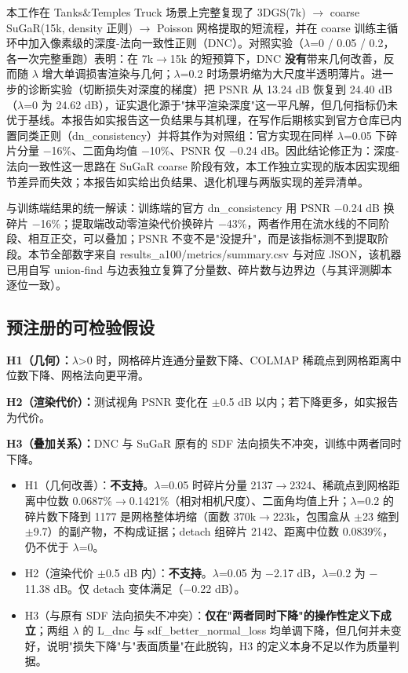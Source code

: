 \documentclass[UTF8,a4paper,11pt]{ctexart}
\begin{document}
本工作在 Tanks\&Temples Truck 场景上完整复现了 3DGS(7k) $\rightarrow$ coarse SuGaR(15k, density 正则) $\rightarrow$ Poisson 网格提取的短流程，并在 coarse 训练主循环中加入像素级的深度-法向一致性正则（DNC）。对照实验（$\lambda$=0 / 0.05 / 0.2，各一次完整重跑）表明：在 7k$\rightarrow$15k 的短预算下，DNC \textbf{没有}带来几何改善，反而随 $\lambda$ 增大单调损害渲染与几何；$\lambda$=0.2 时场景坍缩为大尺度半透明薄片。进一步的诊断实验（切断损失对深度的梯度）把 PSNR 从 13.24 dB 恢复到 24.40 dB（$\lambda$=0 为 24.62 dB），证实退化源于"抹平渲染深度"这一平凡解，但几何指标仍未优于基线。本报告如实报告这一负结果与其机理，在写作后期核实到官方仓库已内置同类正则（dn\_consistency）并将其作为对照组：官方实现在同样 $\lambda$=0.05 下碎片分量 $-$16\%、二面角均值 $-$10\%、PSNR 仅 $-$0.24 dB。因此结论修正为：深度-法向一致性这一思路在 SuGaR coarse 阶段有效，本工作独立实现的版本因实现细节差异而失效；本报告如实给出负结果、退化机理与两版实现的差异清单。

与训练端结果的统一解读：训练端的官方 dn\_consistency 用 PSNR $-$0.24 dB 换碎片 $-$16\%；提取端改动零渲染代价换碎片 $-$43\%，两者作用在流水线的不同阶段、相互正交，可以叠加；PSNR 不变不是"没提升"，而是该指标测不到提取阶段。本节全部数字来自 results\_a100/metrics/summary.csv 与对应 JSON，该机器已用自写 union-find 与边表独立复算了分量数、碎片数与边界边（与其评测脚本逐位一致）。

\subsection{预注册的可检验假设}
\textbf{H1（几何）：}$\lambda$>0 时，网格碎片连通分量数下降、COLMAP 稀疏点到网格距离中位数下降、网格法向更平滑。

\textbf{H2（渲染代价）：}测试视角 PSNR 变化在 $\pm$0.5 dB 以内；若下降更多，如实报告为代价。

\textbf{H3（叠加关系）：}DNC 与 SuGaR 原有的 SDF 法向损失不冲突，训练中两者同时下降。

\begin{itemize}
\setlength{\itemsep}{2pt}
  \item H1（几何改善）：\textbf{不支持}。$\lambda$=0.05 时碎片分量 2137$\rightarrow$2324、稀疏点到网格距离中位数 0.0687\%$\rightarrow$0.1421\%（相对相机尺度）、二面角均值上升；$\lambda$=0.2 的碎片数下降到 1177 是网格整体坍缩（面数 370k$\rightarrow$223k，包围盒从 $\pm$23 缩到 $\pm$9.7）的副产物，不构成证据；detach 组碎片 2142、距离中位数 0.0839\%，仍不优于 $\lambda$=0。
  \item H2（渲染代价 $\pm$0.5 dB 内）：\textbf{不支持}。$\lambda$=0.05 为 $-$2.17 dB，$\lambda$=0.2 为 $-$11.38 dB。仅 detach 变体满足（$-$0.22 dB）。
  \item H3（与原有 SDF 法向损失不冲突）：\textbf{仅在"两者同时下降"的操作性定义下成立}；两组 $\lambda$ 的 L\_dnc 与 sdf\_better\_normal\_loss 均单调下降，但几何并未变好，说明"损失下降"与"表面质量"在此脱钩，H3 的定义本身不足以作为质量判据。
\end{itemize}
\end{document}
